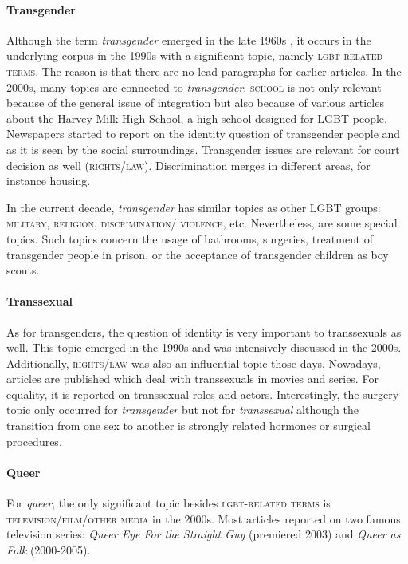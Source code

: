 \documentclass[10pt,a4paper,twocolumn]{scrartcl}
\begin{document}
\paragraph*{Transgender} Although the term \textit{transgender} emerged in the late 1960s \citep{Oliven:1965}, it occurs in the underlying corpus in the 1990s with a significant topic, namely \textsc{lgbt-related terms}. The reason is that there are no lead paragraphs for earlier articles. In the 2000s, many topics are connected to \textit{transgender}. \textsc{school} is not only relevant because of the general issue of integration but also because of various articles about the Harvey Milk High School, a high school designed for LGBT people. Newspapers started to report on the identity question of transgender people and as it is seen by the social surroundings. Transgender issues are relevant for court decision as well (\textsc{rights/law}). Discrimination merges in different areas, for instance housing.

In the current decade, \textit{transgender} has similar topics as other LGBT groups: \textsc{military}, \textsc{religion}, \textsc{discrimination/ violence}, etc. Nevertheless, are some special topics. Such topics concern the usage of bathrooms, surgeries, treatment of transgender people in prison, or the acceptance of transgender children as boy scouts.

\paragraph*{Transsexual} As for transgenders, the question of identity is very important to transsexuals as well. This topic emerged in the 1990s and was intensively discussed in the 2000s. Additionally, \textsc{rights/law} was also an influential topic those days. Nowadays, articles are published which deal with transsexuals in movies and series. For equality, it is reported on transsexual roles and actors. Interestingly, the surgery topic only occurred for \textit{transgender} but not for \textit{transsexual} although the transition from one sex to another is strongly related hormones or surgical procedures.

\paragraph*{Queer} For \textit{queer}, the only significant topic besides \textsc{lgbt-related terms} is \textsc{television/film/other media} in the 2000s. Most articles reported on two famous television series: \textit{Queer Eye For the Straight Guy} (premiered 2003) and \textit{Queer as Folk} (2000-2005).
\end{document}

